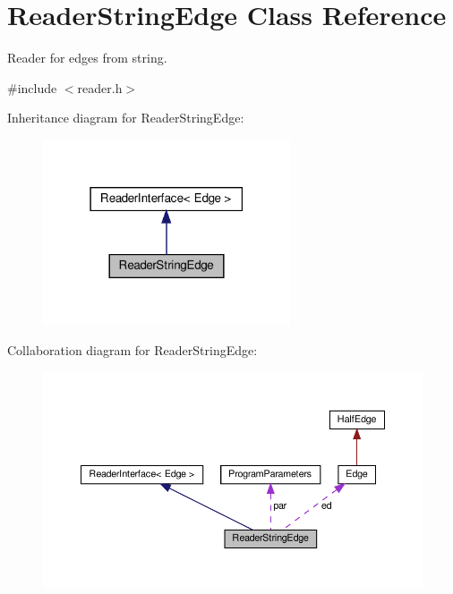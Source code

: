 \hypertarget{classReaderStringEdge}{}\section{Reader\+String\+Edge Class Reference}
\label{classReaderStringEdge}


Reader for edges from string.  




{\ttfamily \#include $<$reader.\+h$>$}



Inheritance diagram for Reader\+String\+Edge\+:\nopagebreak
\begin{figure}[H]
\begin{center}
\leavevmode
\includegraphics[width=207pt]{classReaderStringEdge__inherit__graph}
\end{center}
\end{figure}


Collaboration diagram for Reader\+String\+Edge\+:
\nopagebreak
\begin{figure}[H]
\begin{center}
\leavevmode
\includegraphics[width=350pt]{classReaderStringEdge__coll__graph}
\end{center}
\end{figure}
